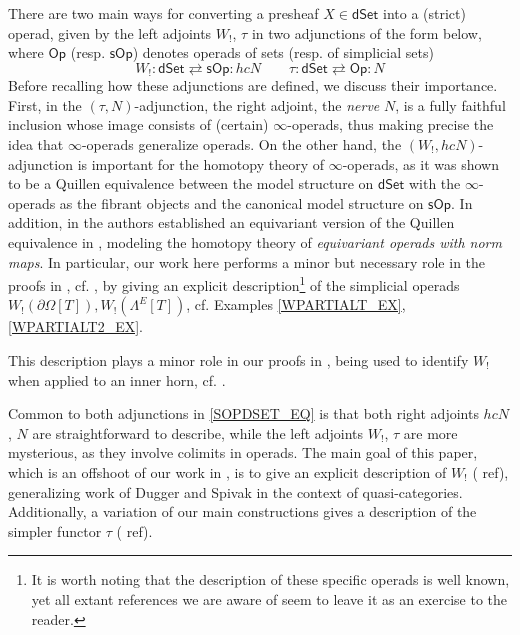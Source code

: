 \documentclass[a4paper,10pt
,draft
]{article}%
\numberwithin{equation}{section}
\numberwithin{figure}{section}
\theoremstyle{definition} %
\newcommand{\Op}{\mathsf{Op}}%
\newcommand{\sOp}{\ensuremath{\mathsf{sOp}}}%
\newcommand{\dSet}{\mathsf{dSet}}
\newcommand{\1}{\ensuremath{\mathbbm 1}}%
\begin{document}
There are two main ways for converting 
a presheaf $X \in \mathsf{dSet}$
into a (strict) operad,
given by the left adjoints
$W_!$, $\tau$
in two adjunctions of the form below,
where $\Op$ (resp. $\sOp$) denotes operads of sets (resp. of simplicial sets)
\begin{equation}\label{SOPDSET_EQ}
	W_! \colon \dSet \rightleftarrows \sOp \colon h c N
	\qquad
	\tau \colon \dSet \rightleftarrows \Op \colon N
\end{equation}
Before recalling how these adjunctions are defined,
we discuss their importance. 
First, in the $(\tau,N)$-adjunction,
the right adjoint, the \emph{nerve} $N$,
is a fully faithful inclusion whose image consists of 
(certain) $\infty$-operads,
thus making precise the idea that 
$\infty$-operads generalize operads.
On the other hand, the $(W_!,hcN)$-adjunction
is important for the homotopy theory of $\infty$-operads,
as it was shown to be a Quillen equivalence \cite{CM13b}
between the model structure on $\dSet$ with the 
$\infty$-operads as the fibrant objects and
the canonical model structure on $\sOp$.
In addition, in \cite{BP_TAS} the authors established an equivariant
version of the Quillen equivalence in \cite{CM13b},
modeling the homotopy theory of 
\emph{equivariant operads with norm maps}.
In particular, 
our work here performs a minor but necessary role in the proofs
in \cite{BP_TAS},
cf. \cite[Lemma \ref{TAS-WLEFTQPUSH LEM}]{BP_TAS},
by giving an explicit description\footnote{It is worth noting that the description of these specific operads is well known,
yet all extant references we are aware of seem to leave it as an exercise to the reader.}
of the simplicial operads
$W_!(\partial \Omega[T]),W_!(\Lambda^E[T])$,
cf. Examples \ref{WPARTIALT_EX},\ref{WPARTIALT2_EX}.


This description plays a minor role in our proofs 
in \cite[\S \ref{TAS-PFMNTHM SEC}]{BP_TAS},
being used to identify
$W_!$ when applied to an inner horn,
cf. \cite[Lemma \ref{TAS-WLEFTQPUSH LEM}]{BP_TAS}.


Common to both adjunctions in \eqref{SOPDSET_EQ}
is that both right adjoints
$hcN$, $N$ are straightforward to describe, 
while the left adjoints $W_!$, $\tau$ are more mysterious,
as they involve colimits in operads.
The main goal of this paper, 
which is an offshoot of our work in \cite{BP_TAS},
is to give an explicit description of $W_!$
{(\color{red} ref)}, 
generalizing work of Dugger and Spivak \cite{DS11}
in the context of quasi-categories.
Additionally, a variation of our main constructions
gives a description of the simpler functor $\tau$
{(\color{red} ref)}.
\end{document}
